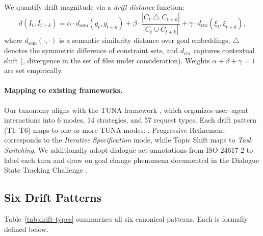 We quantify drift magnitude via a \emph{drift distance} function:
\begin{equation}
    d(I_t, I_{t+k}) = \alpha \cdot d_{\text{sem}}(g_t, g_{t+k}) + \beta \cdot \frac{|C_t \mathbin{\triangle} C_{t+k}|}{|C_t \cup C_{t+k}|} + \gamma \cdot d_{\text{ctx}}(\xi_t, \xi_{t+k}),
    \label{eq:drift-distance}
\end{equation}
where $d_{\text{sem}}(\cdot,\cdot)$ is a semantic similarity distance over goal embeddings, $\triangle$ denotes the symmetric difference of constraint sets, and $d_{\text{ctx}}$ captures contextual shift (\eg, divergence in the set of files under consideration). Weights $\alpha + \beta + \gamma = 1$ are set empirically.

\paragraph{Mapping to existing frameworks.}
Our taxonomy aligns with the TUNA framework \citep{tuna2025}, which organizes user--agent interactions into 6 modes, 14 strategies, and 57 request types. Each drift pattern (T1--T6) maps to one or more TUNA modes: \eg, Progressive Refinement corresponds to the \emph{Iterative Specification} mode, while Topic Shift maps to \emph{Task Switching}. We additionally adopt dialogue act annotations from ISO 24617-2 \citep{iso24617} to label each turn and draw on goal change phenomena documented in the Dialogue State Tracking Challenge \citep{dstc}.

\subsection{Six Drift Patterns}
\label{sec:six-patterns}

Table~\ref{tab:drift-types} summarizes all six canonical patterns. Each is formally defined below.

